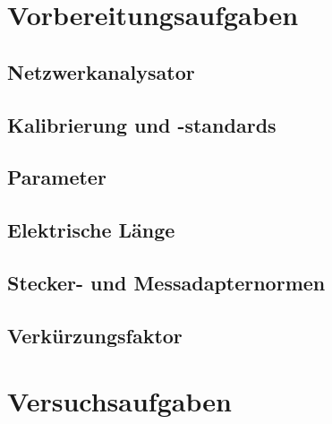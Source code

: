 \documentclass[a4paper, 12pt]{article}
\begin{document}
  
  \clearpage
  \setcounter{page}{1}

\section{Vorbereitungsaufgaben}

  \subsection{Netzwerkanalysator}
   

  \subsection{Kalibrierung und -standards}
   

  \subsection{Parameter}
  

  \subsection{Elektrische Länge}
  

  \subsection{Stecker- und Messadapternormen}
  

  \subsection{Verkürzungsfaktor}
  

\section{Versuchsaufgaben}
\end{document}

